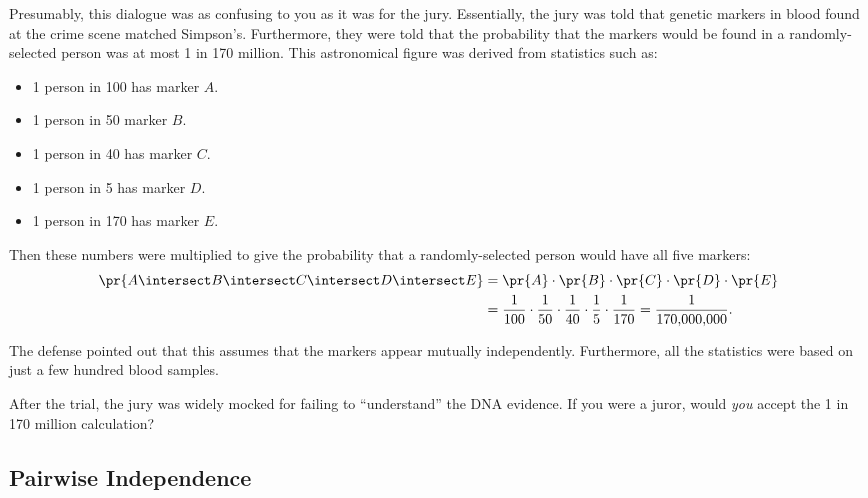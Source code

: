 Presumably, this dialogue was as confusing to you as it was for the
jury.  Essentially, the jury was told that genetic markers in blood
found at the crime scene matched Simpson's.  Furthermore, they were
told that the probability that the markers would be found in a
randomly-selected person was at most 1 in 170 million.  This
astronomical figure was derived from statistics such as:
%
\begin{itemize}
\item 1 person in 100 has marker $A$.
\item 1 person in 50 marker $B$.
\item 1 person in 40 has marker $C$.
\item 1 person in 5 has marker $D$.
\item 1 person in 170 has marker $E$.
\end{itemize}
%
Then these numbers were multiplied to give the probability that a
randomly-selected person would have all five markers:
\begin{align*}
\pr{A \intersect B \intersect C \intersect D \intersect E}
    & = \pr{A} \cdot \pr{B} \cdot \pr{C} \cdot \pr{D} \cdot \pr{E}\\
    & = \frac{1}{100} \cdot \frac{1}{50} \cdot \frac{1}{40}
                     \cdot \frac{1}{5} \cdot \frac{1}{170}
     = \frac{1}{170{,}000{,}000}.
\end{align*}

%
The defense pointed out that this assumes that the markers appear
mutually independently.  Furthermore, all the statistics were based on
just a few hundred blood samples.  

After the trial, the jury was widely mocked for failing to
``understand'' the DNA evidence.  If you were a juror, would
\emph{you} accept the 1 in 170 million calculation?


\subsection{Pairwise Independence}

